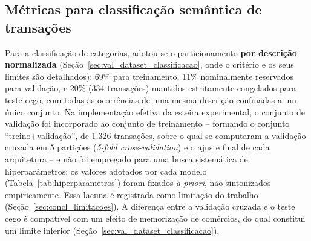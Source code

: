 \subsection{Métricas para classificação semântica de transações}
\label{sec:val_protocolo_classificacao}
Para a classificação de categorias, adotou-se o particionamento \textbf{por descrição normalizada} (Seção~\ref{sec:val_dataset_classificacao}, onde o critério e os seus limites são detalhados): 69\% para treinamento, 11\% nominalmente reservados para validação, e 20\% (334 transações) mantidos estritamente congelados para teste cego, com todas as ocorrências de uma mesma descrição confinadas a um único conjunto. Na implementação efetiva da esteira experimental, o conjunto de validação foi incorporado ao conjunto de treinamento -- formando o conjunto ``treino+validação'', de 1.326 transações, sobre o qual se computaram a validação cruzada em 5 partições (\textit{5-fold cross-validation}) e o ajuste final de cada arquitetura -- e não foi empregado para uma busca sistemática de hiperparâmetros: os valores adotados por cada modelo (Tabela~\ref{tab:hiperparametros}) foram fixados \textit{a priori}, não sintonizados empiricamente. Essa lacuna é registrada como limitação do trabalho (Seção~\ref{sec:concl_limitacoes}). A diferença entre a validação cruzada e o teste cego é compatível com um efeito de memorização de comércios, do qual constitui um limite inferior (Seção~\ref{sec:val_dataset_classificacao}).

